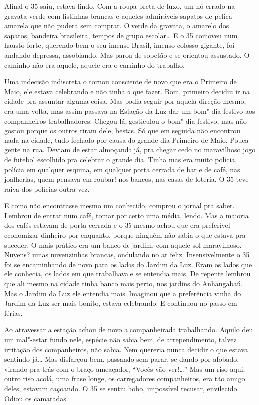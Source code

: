 \begin{linenumbers}
Afinal o 35 saiu, estava lindo. Com a roupa preta de luxo, um nó errado
na gravata verde com listinhas brancas e aqueles admiráveis sapatos de
pelica amarela que não pudera sem comprar. O verde da gravata, o amarelo
dos sapatos, bandeira brasileira, tempos de grupo escolar\ldots{} E o 35
comoveu num hausto forte, querendo bem o seu imenso Brasil, imenso
colosso gigante, foi andando depressa, assobiando. Mas parou de sopetão
e se orientou assustado. O caminho não era aquele, aquele era o caminho
do trabalho.

Uma indecisão indiscreta o tornou consciente de novo que era o Primeiro
de Maio, ele estava celebrando e não tinha o que fazer. Bom, primeiro
decidiu ir na cidade pra assuntar alguma coisa. Mas podia seguir por
aquela direção mesmo, era uma volta, mas assim passava na Estação da Luz
dar um bom"-dia festivo aos companheiros trabalhadores. Chegou lá,
gesticulou o bom"-dia festivo, mas não gostou porque os outros riram
dele, bestas. Só que em seguida não encontrou nada na cidade, tudo
fechado por causa do grande dia Primeiro de Maio. Pouca gente na rua.
Deviam de estar almoçando já, pra chegar cedo no maravilhoso jogo de
futebol escolhido pra celebrar o grande dia. Tinha mas era muito
polícia, polícia em qualquer esquina, em qualquer porta cerrada de bar e
de café, nas joalherias, quem pensava em roubar! nos bancos, nas casas
de loteria. O 35 teve raiva dos polícias outra vez.

E como não encontrasse mesmo um conhecido, comprou o jornal pra saber.
Lembrou de entrar num café, tomar por certo uma média, lendo. Mas a
maioria dos cafés estavam de porta cerrada e o 35 mesmo achou que era
preferível economizar dinheiro por enquanto, porque ninguém não sabia o
que estava pra suceder. O mais prático era um banco de jardim, com
aquele sol maravilhoso. Nuvens? umas nuvenzinhas brancas, ondulando no
ar feliz. Insensivelmente o 35 foi se encaminhando de novo para os lados
do Jardim da Luz. Eram os lados que ele conhecia, os lados em que
trabalhava e se entendia mais. De repente lembrou que ali mesmo na
cidade tinha banco mais perto, nos jardins do Anhangabaú. Mas o Jardim
da Luz ele entendia mais. Imaginou que a preferência vinha do Jardim da
Luz ser mais bonito, estava celebrando. E continuou no passo em férias.

Ao atravessar a estação achou de novo a companheirada trabalhando.
Aquilo deu um mal"-estar fundo nele, espécie não sabia bem, de
arrependimento, talvez irritação dos companheiros, não sabia. Nem
quereria nunca decidir o que estava sentindo já\ldots{} Mas disfarçou bem,
passando sem parar, se dando por afobado, virando pra trás com o braço
ameaçador, ``Vocês vão ver!\ldots{}'' Mas um riso aqui, outro riso acolá, uma
frase longe, os carregadores companheiros, era tão amigo deles, estavam
caçoando. O 35 se sentiu bobo, impossível recusar, envilecido. Odiou os
camaradas.


\end{linenumbers}
